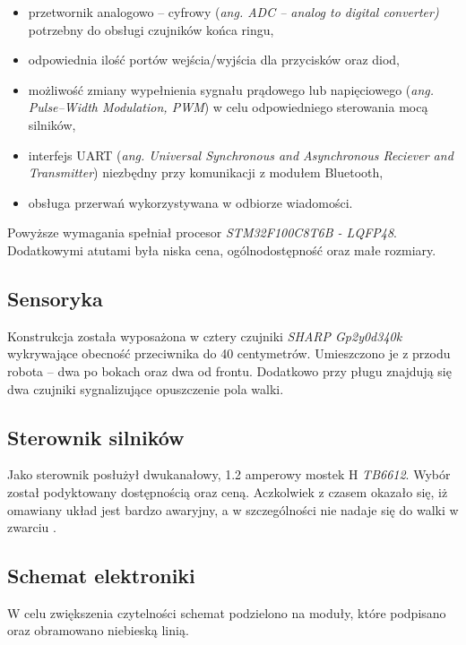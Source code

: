 \begin{itemize}
\item przetwornik analogowo – cyfrowy (\textit{ang. ADC – analog to digital converter)} potrzebny do obsługi czujników końca ringu,
\item odpowiednia ilość portów wejścia/wyjścia dla przycisków oraz diod,
\item możliwość zmiany wypełnienia sygnału prądowego lub napięciowego (\textit{ang. Pulse–Width Modulation, PWM}) w celu odpowiedniego sterowania mocą silników,
\item interfejs UART (\textit{ang. Universal Synchronous and Asynchronous Reciever and Transmitter}) niezbędny przy komunikacji z modułem Bluetooth,
\item obsługa przerwań wykorzystywana w odbiorze wiadomości.
\end{itemize}

Powyższe wymagania spełniał procesor \textit{STM32F100C8T6B - LQFP48}. Dodatkowymi atutami była niska cena, ogólnodostępność oraz małe rozmiary.

\subsection{Sensoryka}
Konstrukcja została wyposażona w cztery czujniki \textit{SHARP Gp2y0d340k} wykrywające obecność przeciwnika do 40 centymetrów. Umieszczono je z przodu robota – dwa po bokach oraz dwa od frontu. Dodatkowo przy pługu znajdują się dwa czujniki sygnalizujące opuszczenie pola walki.

\subsection{Sterownik silników}
Jako sterownik posłużył dwukanałowy, 1.2 amperowy mostek H \textit{TB6612}. Wybór został podyktowany dostępnością oraz ceną. Aczkolwiek z czasem okazało się, iż omawiany układ jest bardzo awaryjny, a w szczególności nie nadaje się do walki w zwarciu \cite{AVR}.

\subsection{Schemat elektroniki}
W celu zwiększenia czytelności schemat podzielono na moduły, które podpisano oraz obramowano niebieską linią. 

